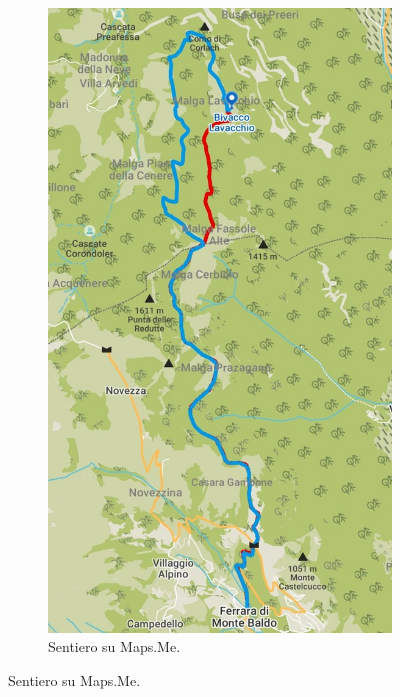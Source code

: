 \documentclass{article}
\begin{document}
\begin{figure}[htbp!]
    \centering
    \begin{subfigure}[t]{0.45\textwidth}
        \centering
        \vspace{0pt} %
        \includegraphics[width=\textwidth]{images/sentiero_mapsMe.jpg}
        \caption{Sentiero su Maps.Me.}
        \label{fig:foto_lunga}
    \end{subfigure}

\end{figure}
\end{document}
